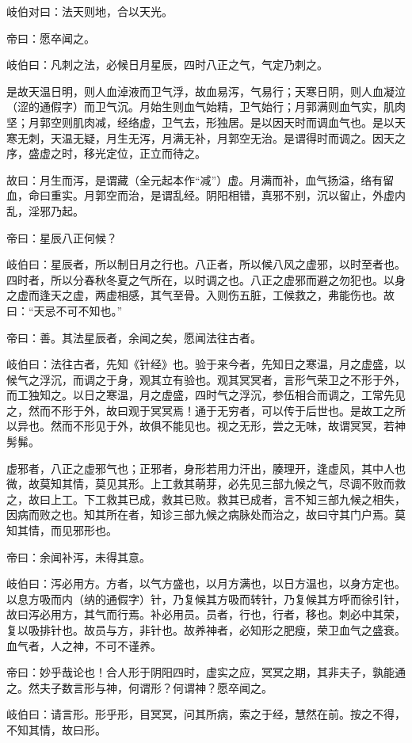 \documentclass{article}%
\begin{document}
岐伯对曰：法天则地，合以天光。

帝曰：愿卒闻之。

岐伯曰：凡刺之法，必候日月星辰，四时八正之气，气定乃刺之。

是故天温日明，则人血淖液而卫气浮，故血易泻，气易行；天寒日阴，则人血凝泣（涩的通假字）而卫气沉。月始生则血气始精，卫气始行；月郭满则血气实，肌肉坚；月郭空则肌肉减，经络虚，卫气去，形独居。是以因天时而调血气也。是以天寒无刺，天温无疑，月生无泻，月满无补，月郭空无治。是谓得时而调之。因天之序，盛虚之时，移光定位，正立而待之。

故曰：月生而泻，是谓藏（全元起本作“减”）虚。月满而补，血气扬溢，络有留血，命曰重实。月郭空而治，是谓乱经。阴阳相错，真邪不别，沉以留止，外虚内乱，淫邪乃起。

帝曰：星辰八正何候？

岐伯曰：星辰者，所以制日月之行也。八正者，所以候八风之虚邪，以时至者也。四时者，所以分春秋冬夏之气所在，以时调之也。八正之虚邪而避之勿犯也。以身之虚而逢天之虚，两虚相感，其气至骨。入则伤五脏，工候救之，弗能伤也。故曰：“天忌不可不知也。”

帝曰：善。其法星辰者，余闻之矣，愿闻法往古者。

岐伯曰：法往古者，先知《针经》也。验于来今者，先知日之寒温，月之虚盛，以候气之浮沉，而调之于身，观其立有验也。观其冥冥者，言形气荣卫之不形于外，而工独知之。以日之寒温，月之虚盛，四时气之浮沉，参伍相合而调之，工常先见之，然而不形于外，故曰观于冥冥焉！通于无穷者，可以传于后世也。是故工之所以异也。然而不形见于外，故俱不能见也。视之无形，尝之无味，故谓冥冥，若神髣髴。

虚邪者，八正之虚邪气也；正邪者，身形若用力汗出，腠理开，逢虚风，其中人也微，故莫知其情，莫见其形。上工救其萌芽，必先见三部九候之气，尽调不败而救之，故曰上工。下工救其已成，救其已败。救其已成者，言不知三部九候之相失，因病而败之也。知其所在者，知诊三部九候之病脉处而治之，故曰守其门户焉。莫知其情，而见邪形也。

帝曰：余闻补泻，未得其意。

岐伯曰：泻必用方。方者，以气方盛也，以月方满也，以日方温也，以身方定也。以息方吸而内（纳的通假字）针，乃复候其方吸而转针，乃复候其方呼而徐引针，故曰泻必用方，其气而行焉。补必用员。员者，行也，行者，移也。刺必中其荣，复以吸排针也。故员与方，非针也。故养神者，必知形之肥瘦，荣卫血气之盛衰。血气者，人之神，不可不谨养。

帝曰：妙乎哉论也！合人形于阴阳四时，虚实之应，冥冥之期，其非夫子，孰能通之。然夫子数言形与神，何谓形？何谓神？愿卒闻之。

岐伯曰：请言形。形乎形，目冥冥，问其所病，索之于经，慧然在前。按之不得，不知其情，故曰形。
\end{document}
